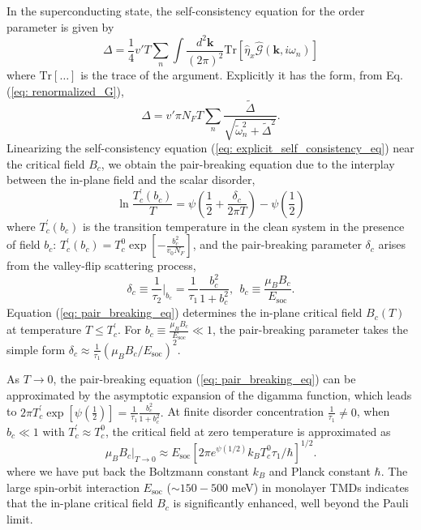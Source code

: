 In the superconducting state, the self-consistency equation for the
order parameter is given by
\begin{equation}
\Delta=\frac{1}{4}v'T\sum_{n}\int\frac{d^{2}\mathbf{k}}{(2\pi)^{2}}\mathrm{Tr}\left[\hat{\eta}_{x}\hat{\mathcal{G}}(\mathbf{k},i\omega_{n})\right]\label{eq: self_consistency_eq}
\end{equation}
where $\mathrm{Tr}\left[\dots\right]$ is the trace of the argument.
Explicitly it has the form, from Eq. (\ref{eq: renormalized_G}),
\begin{equation}
\Delta=v'\pi N_{F}T\sum_{n}\frac{\tilde{\Delta}}{\sqrt{\tilde{\omega}_{n}^{2}+\tilde{\Delta}^{2}}}.\label{eq: explicit_self_consistency_eq}
\end{equation}
Linearizing the self-consistency equation (\ref{eq: explicit_self_consistency_eq})
near the critical field $B_{c}$, we obtain the pair-breaking equation
due to the interplay between the in-plane field and the scalar disorder,
\begin{equation}
\ln\frac{T_{c}^{'}(b_{c})}{T}=\psi\left(\frac{1}{2}+\frac{\delta_{c}}{2\pi T}\right)-\psi\left(\frac{1}{2}\right)\label{eq: pair_breaking_eq}
\end{equation}
where $T_{c}^{'}(b_{c})$ is the transition temperature in the clean
system in the presence of field $b_{c}$: $T_{c}^{'}(b_{c})=T_{c}^{0}\exp\left[-\frac{b_{c}^{2}}{v_{0}N_{F}}\right]$,
and the pair-breaking parameter $\delta_{c}$ arises from the valley-flip
scattering process,
\begin{equation}
\delta_{c}\equiv\frac{1}{\tau_{2}}\biggl|_{b_{c}}=\frac{1}{\tau_{1}}\frac{b_{c}^{2}}{1+b_{c}^{2}},\ \ b_{c}\equiv\frac{\mu_{B}B_{c}}{E_{\text{soc}}}.\label{eq: parameter_pair_breaking}
\end{equation}
Equation (\ref{eq: pair_breaking_eq}) determines the in-plane critical
field $B_{c}(T)$ at temperature $T\leq T_{c}^{'}$. For $b_{c}\equiv\frac{\mu_{B}B_{c}}{E_{\text{soc}}}\ll1$,
the pair-breaking parameter takes the simple form $\delta_{c}\approx\frac{1}{\tau_{1}}\left(\mu_{B}B_{c}/E_{\text{soc}}\right)^{2}$.

As $T\rightarrow0$, the pair-breaking equation (\ref{eq: pair_breaking_eq})
can be approximated by the asymptotic expansion of the digamma function,
which leads to $2\pi T_{c}^{'}\exp\left[\psi(\frac{1}{2})\right]=\frac{1}{\tau_{1}}\frac{b_{c}^{2}}{1+b_{c}^{2}}.$
At finite disorder concentration $\frac{1}{\tau_{1}}\neq0$, when
$b_{c}\ll1$ with $T_{c}^{'}\approx T_{c}^{0}$, the critical field at zero temperature is approximated as
\begin{equation}
\mu_{B}B_{c}\biggl|_{T\rightarrow0}\approx E_{\text{soc}}\left[2\pi e^{\psi(1/2)}k_{B}T_{c}^{0}\tau_{1}/\hbar\right]^{1/2}.\label{eq: zero_T_Bc}
\end{equation}
where we have put back the Boltzmann constant $k_{B}$ and
Planck constant $\hbar$. The large spin-orbit interaction $E_{\text{soc}}$
($\sim150-500$ meV) in monolayer TMDs indicates that the in-plane
critical field $B_{c}$ is significantly enhanced, well beyond the
Pauli limit.
